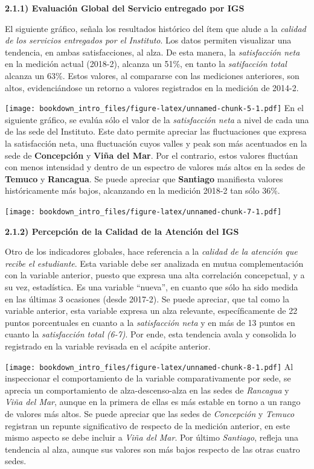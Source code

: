 \documentclass[]{book}
\begin{document}
\textbf{2.1.1) Evaluación Global del Servicio entregado por IGS}

El siguiente gráfico, señala los resultados histórico del ítem que alude
a la \emph{calidad de los servicios entregados por el Instituto}. Los
datos permiten visualizar una tendencia, en ambas satisfacciones, al
alza. De esta manera, la \emph{satisfacción neta} en la medición actual
(2018-2), alcanza un 51\%, en tanto la \emph{satifacción total} alcanza
un 63\%. Estos valores, al compararse con las mediciones anteriores, son
altos, evidenciándose un retorno a valores registrados en la medición de
2014-2.

\texttt{[image: bookdown\_intro\_files/figure-latex/unnamed-chunk-5-1.pdf]}
En el siguiente gráfico, se evalúa sólo el valor de la
\emph{satisfacción neta} a nivel de cada una de las sede del Instituto.
Este dato permite apreciar las fluctuaciones que expresa la satisfacción
neta, una fluctuación cuyos valles y peak son más acentuados en la sede
de \textbf{Concepción} y \textbf{Viña del Mar}. Por el contrario, estos
valores fluctúan con menos intensidad y dentro de un espectro de valores
más altos en la sedes de \textbf{Temuco} y \textbf{Rancagua}. Se puede
apreciar que \textbf{Santiago} manifiesta valores históricamente más
bajos, alcanzando en la medición 2018-2 tan sólo 36\%.

\texttt{[image: bookdown\_intro\_files/figure-latex/unnamed-chunk-7-1.pdf]}

\textbf{2.1.2) Percepción de la Calidad de la Atención del IGS}

Otro de los indicadores globales, hace referencia a la \emph{calidad de
la atención que recibe el estudiante}. Esta variable debe ser analizada
en mutua complementación con la variable anterior, puesto que expresa
una alta correlación concepctual, y a su vez, estadística. Es una
variable ``nueva'', en cuanto que sólo ha sido medida en las últimas 3
ocasiones (desde 2017-2). Se puede apreciar, que tal como la variable
anterior, esta variable expresa un alza relevante, específicamente de 22
puntos porcentuales en cuanto a la \emph{satisfacción neta} y en más de
13 puntos en cuanto la \emph{satisfacción total (6-7)}. Por ende, esta
tendencia avala y consolida lo registrado en la variable revisada en el
acápite anterior.

\texttt{[image: bookdown\_intro\_files/figure-latex/unnamed-chunk-8-1.pdf]}
Al inspeccionar el comportamiento de la variable comparativamente por
sede, se aprecia un comportamiento de alza-descenso-alza en las sedes de
\emph{Rancagua} y \emph{Viña del Mar}, aunque en la primera de ellas es
más estable en torno a un rango de valores más altos. Se puede apreciar
que las sedes de \emph{Concepción} y \emph{Temuco} registran un repunte
significativo de respecto de la medición anterior, en este mismo aspecto
se debe incluir a \emph{Viña del Mar}. Por último \emph{Santiago},
refleja una tendencia al alza, aunque sus valores son más bajos respecto
de las otras cuatro sedes.
\end{document}
